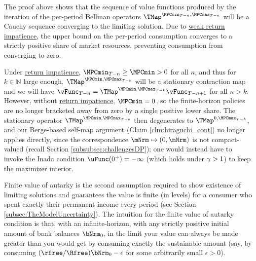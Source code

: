 \documentclass[\econtexRoot/BufferStockTheory]{subfiles}
\begin{document}
The proof above shows that the sequence of value functions produced by the iteration of the per-period Bellman operators $\TMap^{\MPCmin_{T-n}, \MPCmax_{T-n}}$  will be a Cauchy sequence converging to the limiting solution.
Due to \hyperlink{WRIC}{weak return impatience}, the upper bound on the per-period consumption converges to a strictly positive share of market resources, preventing consumption from converging to zero.




\begin{remark}\label{remark:ricstationary}
Under \hyperlink{RIC}{return impatience}, $\MPCmin_{T-n}\geq \MPCmin>0$ for all $n$, and thus for $k\in \mathbb{N}$ large enough, $\TMap^{\MPCmin, \MPCmax_{T-k}}$ will be a stationary contraction map and we will  have $\vFunc_{T-n} = \TMap^{\MPCmin, \MPCmax_{T-k}}\vFunc_{T-n+1}$ for all $n>k$. However, without \hyperlink{RIC}{return impatience}, $\MPCmin = 0$, so the finite-horizon policies are no longer bracketed away from zero by a single positive lower share. The stationary operator $\TMap^{\MPCmin, \MPCmax_{T-k}}$ then degenerates to $\TMap^{0, \MPCmax_{T-k}}$, and our Berge-based self-map argument (Claim \ref{clm:hiraguchi_cont}) no longer applies directly, since the correspondence $\mNrm\mapsto(0,\mNrm)$ is not compact-valued (recall Section \ref{subsubsec:challengesDP}); one would instead have to invoke the Inada condition $\uFunc(0^{+})=-\infty$ (which holds under $\gamma>1$) to keep the maximizer interior.
\end{remark}


Finite value of autarky is the second assumption required to show existence of limiting solutions and guarantees the value is finite (in levels) for a consumer who spent exactly their permanent income every period (see Section \ref{subsec:TheModelUncertainty}).
The intuition for the finite value of autarky condition is that, with an infinite-horizon, with any strictly positive initial amount of bank balances $\bNrm_{0}$, in the limit your value can always be made greater than you would get by consuming exactly the sustainable amount (say, by consuming $(\rfree/\Rfree)\bNrm_{0}-\epsilon$ for some arbitrarily small $\epsilon>0$).
\end{document}
